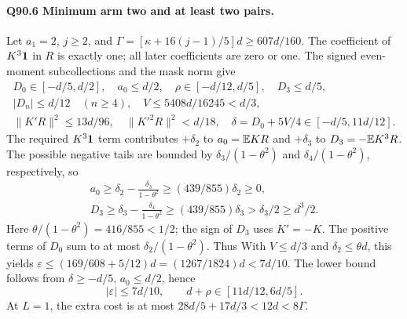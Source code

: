 \paragraph{Q90.6 Minimum arm two and at least two pairs.}
Let \(a_1=\allowbreak 2\), \(j\ge\allowbreak 2\), and
\(\Gamma=\allowbreak [\kappa+16(j-1)/5]d\ge\allowbreak 607d/160\).
The coefficient of \(K^3\mathbf1\) in \(R\) is exactly one; all later
coefficients are zero or one.
The signed even-moment subcollections and the mask norm give
\begin{equation}\tag{Q90.6.1}\label{eq:Q90:6.1}
\begin{gathered}
D_0\in[-d/5,d/2],\quad a_0\le d/2,\quad
\rho\in[-d/12,d/5],\quad D_3\le d/5,\\
|D_n|\le d/12\quad(n\ge4),\quad
V\le5408d/16245<d/3,\\
\|K'R\|^2\le13d/96,\quad\|K'^2R\|^2<d/18,\quad
\delta=D_0+5V/4\in[-d/5,11d/12].
\end{gathered}
\end{equation}
The required \(K^3\mathbf1\) term contributes \(+\delta_2\) to
\(a_0=\allowbreak \mathbb E KR\) and \(+\delta_3\) to \(D_3=\allowbreak -\mathbb E K^3R\).
The possible negative tails are bounded by
\(\delta_3/(1-\theta^2)\) and \(\delta_4/(1-\theta^2)\), respectively, so
\begin{equation}\tag{Q90.6.2}\label{eq:Q90:6.2}
\begin{gathered}
a_0\ge\delta_2-\frac{\delta_3}{1-\theta^2}
\ge(439/855)\delta_2\ge0,\\
D_3\ge\delta_3-\frac{\delta_4}{1-\theta^2}
\ge(439/855)\delta_3>\delta_3/2\ge d^3/2.
\end{gathered}
\end{equation}
Here \(\theta/(1-\theta^2)=\allowbreak 416/855<\allowbreak 1/2\); the sign of \(D_3\)
uses \(K'=\allowbreak -K\).
The positive terms of \(D_0\) sum to at most
\(\delta_2/(1-\theta^2)\). Thus
With \(V\le\allowbreak  d/3\) and \(\delta_2\le\allowbreak \theta d\), this yields
\(\varepsilon\le\allowbreak (169/608+5/12)d=\allowbreak (1267/1824)d<\allowbreak 7d/10\).
The lower bound follows from \(\delta\ge\allowbreak -d/5\), \(a_0\le\allowbreak  d/2\), hence
\begin{equation}\tag{Q90.6.3}\label{eq:Q90:6.3}
|\varepsilon|\le7d/10,\qquad d+\rho\in[11d/12,6d/5].
\end{equation}
At \(L=\allowbreak 1\), the extra cost is at most
\(28d/5+17d/3<\allowbreak 12d<\allowbreak 8\Gamma\).
